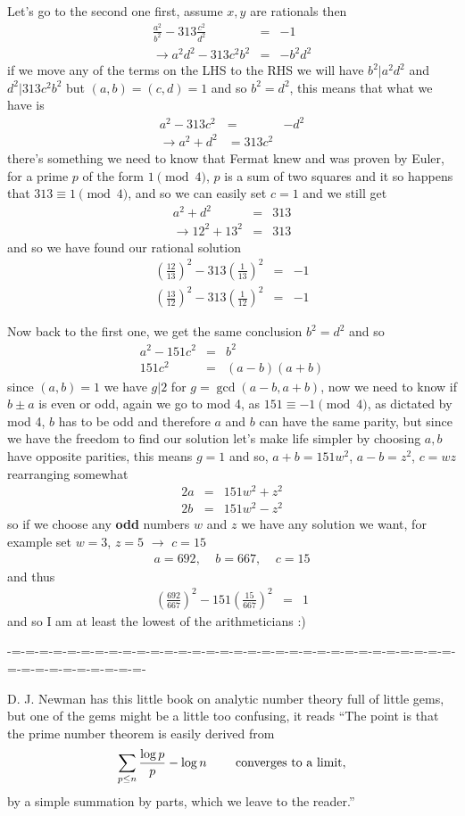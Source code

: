 \documentclass[aps,preprint,preprintnumbers,nofootinbib,showpacs,prd]{revtex4-1}
\newcommand{\nbea}{\begin{eqnarray*}}
\newcommand{\neea}{\end{eqnarray*}}
\begin{document}
Let's go to the second one first, assume $x,y$ are rationals then
%
\nbea\frac{a^2}{b^2}-  313 \frac{c^2}{d^2} & = & -1 \\
\to a^2d^2 - 313 c^2b^2 & = & -b^2 d^2
\neea
%
if we move any of the terms on the LHS to the RHS we will have $b^2|a^2d^2$ and $d^2|313c^2b^2$ but $(a,b)=(c,d)=1$ and so $b^2 = d^2$, this means that what we have is
%
\nbea
a^2 - 313 c^2 & = & -d^2 \\
\to a^2 + d^2 & =  313c^2
\neea
%
there's something we need to know that Fermat knew and was proven by Euler, for a prime $p$ of the form $1 \pmod{4}$, $p$ is a sum of two squares and it so happens that $313 \equiv 1 \pmod{4}$, and so we can easily set $c=1$ and we still get
%
\nbea
a^2 + d^2 & = & 313 \\
\to 12^2 + 13^2 & = & 313
\neea
%
and so we have found our rational solution
%
\nbea
\left(\frac{12}{13}\right)^2 - 313 \left(\frac{1}{13}\right)^2 & = & -1 \\
\left(\frac{13}{12}\right)^2 - 313 \left(\frac{1}{12}\right)^2 & = & -1
\neea
%

Now back to the first one, we get the same conclusion $b^2=d^2$ and so
%
\nbea
a^2 - 151c^2 & = & b^2 \\
151c^2 & = & (a-b)(a+b)
\neea
%
since $(a,b)=1$ we have $g|2$ for $g=\gcd(a-b,a+b)$, now we need to know if $b\pm a$ is even or odd, again we go to mod 4, as $151 \equiv -1 \pmod{4}$, as dictated by mod 4, $b$ has to be odd and therefore $a$ and $b$ can have the same parity, but since we have the freedom to find our solution let's make life simpler by choosing $a,b$ have opposite parities, this means $g=1$ and so, $a+b=151w^2$, $a-b = z^2$, $c = wz$ rearranging somewhat
%
\nbea
2a & = & 151w^2 + z^2 \\
2b & = & 151w^2 - z^2
\neea
%
so if we choose any {\bf odd} numbers $w$ and $z$ we have any solution we want, for example set $w=3$, $z=5$ $\to$  $c=15$
%
\nbea
a = 692,~~~~~ b = 667,~~~~~ c = 15
\neea
%
and thus
%
\nbea
\left(\frac{692}{667}\right)^2 - 151 \left(\frac{15}{667}\right)^2 & = & 1
\neea
%
and so I am at least the lowest of the arithmeticians :)

-=-=-=-=-=-=-=-=-=-=-=-=-=-=-=-=-=-=-=-=-=-=-=-=-=-=-=-=-=-=-=-=-=-=-=-=-=-=-=-=-=-=-

D. J. Newman has this little book on analytic number theory full of little gems, but one of the gems might be a little too confusing, it reads
``The point is that the prime number theorem is easily derived from
%
\nbea
\sum_{p\le n}\frac{\log p}{p} - \log n {\rm~~~~~~~converges~to~a~limit,}
\neea
%
by a simple summation by parts, which we leave to the reader.''
\end{document}
